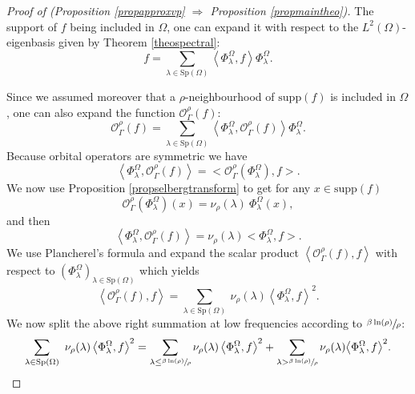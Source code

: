 \documentclass[JEP,XML,SOM,Unicode,NoFloatCountersInSection,published]{cedram}
\let\mathcal\mathscr
\theoremstyle{plain}
\theoremstyle{definition}
\newcommand{\supp}[1]{\mathrm{supp}(#1)}
\newcommand{\somme}[1]{\sum_{#1}}
\begin{document}
\begin{proof}[Proof of (Proposition \ref{propapproxvp}
$\Rightarrow$ Proposition \ref{propmaintheo})]
The support of $f$ being included in $\Omega$, one can expand it with respect to the $L^2(\Omega)$-eigenbasis given by Theorem \ref{theospectral}:
\[
f = \somme{\lambda \in \mathrm{Sp}(\Omega)} \left<\Phi^{\Omega}_{\lambda},f \right> \Phi^{\Omega}_{\lambda}.
\]

Since we assumed moreover that a $\rho$-neighbourhood of $\supp{f}$ is included in $\Omega$, one can also expand the function $\mathcal{O}^{\rho}_{\Gamma}(f)$:
\begin{equation*}
\mathcal{O}^{\rho}_{\Gamma}(f) = \somme{\lambda \in \mathrm{Sp}(\Omega)} \left<\Phi^{\Omega}_{\lambda}, \mathcal{O}^{\rho}_{\Gamma}(f) \right> \Phi^{\Omega}_{\lambda}.
\end{equation*}
Because orbital operators are symmetric we have
\[
\left<\Phi^{\Omega}_{\lambda}, \mathcal{O}^{\rho}_{\Gamma}(f) \right> = \bigl< \mathcal{O}^{\rho}_{\Gamma}(\Phi^{\Omega}_{\lambda}), f \bigr>.
\]
We now use Proposition \ref{propselbergtransform} to get for any $x \in \text{supp}(f)$
\[
\mathcal{O}_{\Gamma}^{\rho} \left(\Phi^{\Omega}_{\lambda} \right)(x) = \nu_{\rho}(\lambda) \ \Phi^{\Omega}_{\lambda}(x),
\]
and then
\[
\left<\Phi^{\Omega}_{\lambda}, \mathcal{O}^{\rho}_{\Gamma}(f) \right> = \nu_{\rho}(\lambda) \bigl< \Phi^{\Omega}_{\lambda}, f \bigr>.
\]
We use Plancherel's formula and expand the scalar product
$\left< \mathcal{O}_{\Gamma}^{\rho}(f),f \right>$ with respect to $(\Phi^{\Omega}_{\lambda})_{\lambda \in \text{Sp}(\Omega)}$ which yields
\[
\left< \mathcal{O}_{\Gamma}^{\rho}(f),f \right> = \somme{\lambda \in \mathrm{Sp}(\Omega)} \ \nu_{\rho}(\lambda) \left<\Phi^{\Omega}_{\lambda},f \right>^2.
\]
We now split the above right summation at low frequencies according to $\sfrac{\beta \ln (\rho)} {\rho}$:
\begin{equation}
\label{equation13}
\somme{\lambda \in \mathrm{Sp}(\Omega)} \ \nu_{\rho}(\lambda) \left<\Phi^{\Omega}_{\lambda},f \right>^2 = \somme{ \lambda \le \sfrac{\beta \ln (\rho)} {\rho}} \nu_{\rho}(\lambda) \left<\Phi^{\Omega}_{\lambda},f \right>^2 + \somme{ \lambda > \sfrac{\beta \ln (\rho)} {\rho}} \nu_{\rho}(\lambda) \bigl<\Phi^{\Omega}_{\lambda},f \bigr>^2.
\end{equation}


\end{proof}
\end{document}
